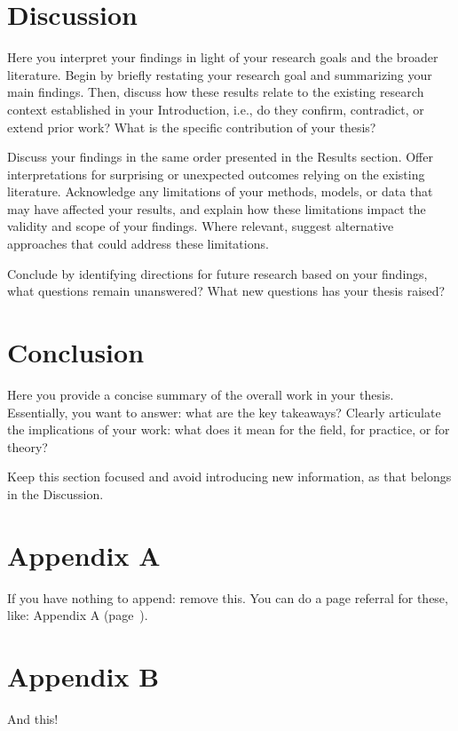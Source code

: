 \documentclass[11pt, a4paper]{article}
\begin{document}
\section{Discussion}

Here you interpret your findings in light of your research goals and the broader literature. Begin by briefly restating your research goal and summarizing your main findings. Then, discuss how these results relate to the existing research context established in your Introduction, i.e., do they confirm, contradict, or extend prior work? What is the specific contribution of your thesis?

Discuss your findings in the same order presented in the Results section. Offer interpretations for surprising or unexpected outcomes relying on the existing literature. Acknowledge any limitations of your methods, models, or data that may have affected your results, and explain how these limitations impact the validity and scope of your findings. Where relevant, suggest alternative approaches that could address these limitations.

Conclude by identifying directions for future research based on your findings, what questions remain unanswered? What new questions has your thesis raised?

\section{Conclusion}

Here you provide a concise summary of the overall work in your thesis. Essentially, you want to answer: what are the key takeaways? Clearly articulate the implications of your work: what does it mean for the field, for practice, or for theory?

Keep this section focused and avoid introducing new information, as that belongs in the Discussion.



\section*{Appendix A} \label{app:a}

If you have nothing to append: remove this. You can do a page referral for these, like: Appendix A (page~\pageref{app:a}).

\section*{Appendix B}

And this!
\end{document}
